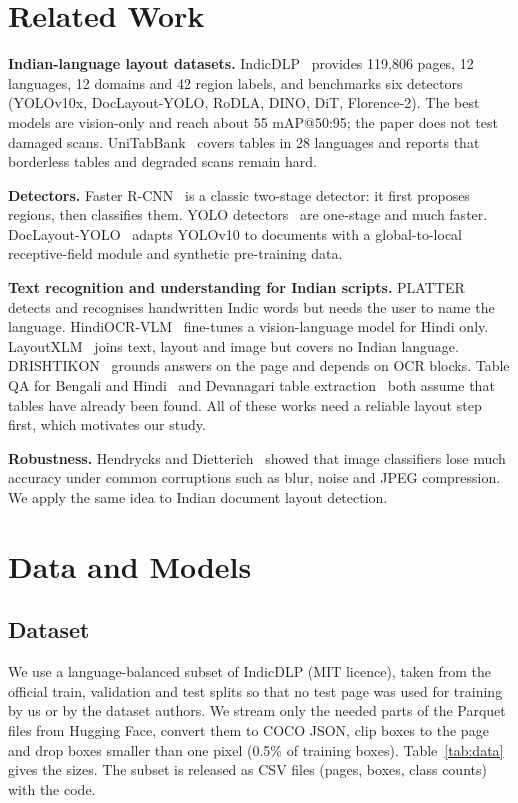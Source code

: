 \documentclass[conference]{IEEEtran}
\begin{document}
\section{Related Work}
\textbf{Indian-language layout datasets.} IndicDLP~\cite{indicdlp} provides 119{,}806 pages, 12 languages, 12
domains and 42 region labels, and benchmarks six detectors (YOLOv10x, DocLayout-YOLO, RoDLA, DINO, DiT,
Florence-2). The best models are vision-only and reach about 55 mAP@50:95; the paper does not test damaged scans.
UniTabBank~\cite{unitabbank} covers tables in 28 languages and reports that borderless tables and degraded scans
remain hard.

\textbf{Detectors.} Faster R-CNN~\cite{fasterrcnn} is a classic two-stage detector: it first proposes regions,
then classifies them. YOLO detectors~\cite{yolov8} are one-stage and much faster. DocLayout-YOLO~\cite{doclayout}
adapts YOLOv10 to documents with a global-to-local receptive-field module and synthetic pre-training data.

\textbf{Text recognition and understanding for Indian scripts.} PLATTER~\cite{platter} detects and recognises
handwritten Indic words but needs the user to name the language. HindiOCR-VLM~\cite{hindiocr} fine-tunes a
vision-language model for Hindi only. LayoutXLM~\cite{layoutxlm} joins text, layout and image but covers no Indian
language. DRISHTIKON~\cite{drishtikon} grounds answers on the page and depends on OCR blocks. Table QA for Bengali
and Hindi~\cite{tableqa} and Devanagari table extraction~\cite{devtables} both assume that tables have already
been found. All of these works need a reliable layout step first, which motivates our study.

\textbf{Robustness.} Hendrycks and Dietterich~\cite{hendrycks} showed that image classifiers lose much accuracy
under common corruptions such as blur, noise and JPEG compression. We apply the same idea to Indian document
layout detection.

\section{Data and Models}
\subsection{Dataset}
We use a language-balanced subset of IndicDLP (MIT licence), taken from the official train, validation and test
splits so that no test page was used for training by us or by the dataset authors. We stream only the needed
parts of the Parquet files from Hugging Face, convert them to COCO JSON, clip boxes to the page and drop boxes
smaller than one pixel (0.5\% of training boxes). Table~\ref{tab:data} gives the sizes. The subset is released as
CSV files (pages, boxes, class counts) with the code.
\end{document}
